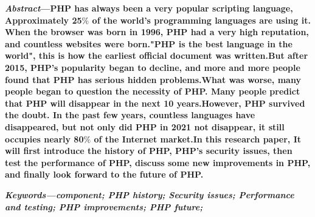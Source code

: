 \documentclass[12pt]{report}
\renewcommand{\_}{\kern-1.5pt\textunderscore\kern-1.5pt}
\begin{document}
\vspace{\baselineskip}
\begin{multicols}{2}
\setlength{\parskip}{9.96pt}
\begin{justify}
{\fontsize{9pt}{10.8pt}\selectfont \textbf{\textit{Abstract}—PHP has always been a very popular scripting language, Approximately 25$\%$  of the world’s programming languages are using it. When the browser was born in 1996, PHP had a very high reputation, and countless websites were born."PHP is the best language in the world", this is how the earliest official document was written.But after 2015, PHP's popularity began to decline, and more and more people found that PHP has serious hidden problems.What was worse, many people began to question the necessity of PHP. Many people predict that PHP will disappear in the next 10 years.However, PHP survived the doubt. In the past few years, countless languages have disappeared, but not only did PHP in 2021 not disappear, it still occupies nearly 80$\%$  of the Internet market.In this research paper, It will first introduce the history of PHP, PHP's security issues, then test the performance of PHP, discuss some new improvements in PHP, and finally look forward to the future of PHP.}\par}
\end{justify}
\setlength{\parskip}{6.0pt}
\begin{justify}
{\fontsize{9pt}{10.8pt}\selectfont \textbf{\textit{Keywords—component; PHP history; Security issues; Performance and testing; PHP improvements; PHP future; }}{\fontsize{10pt}{12.0pt}\selectfont \textsc{ }\par}\par}

\end{justify}

\vspace{\baselineskip}\setlength{\parskip}{3.96pt}

\end{multicols}
\end{document}

